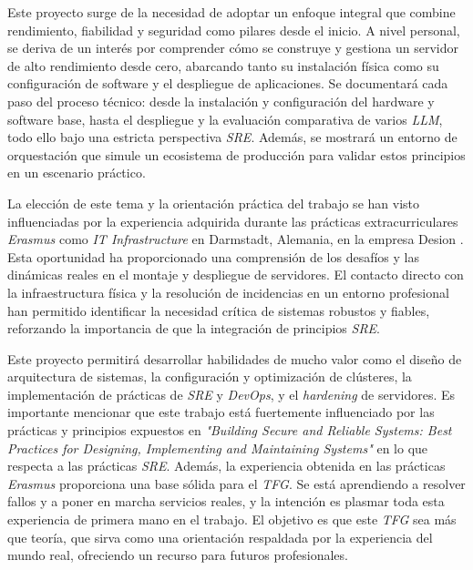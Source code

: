 Este proyecto surge de la necesidad de adoptar un enfoque integral que combine rendimiento, fiabilidad y seguridad como pilares desde el inicio. A nivel personal, se deriva de un interés por comprender cómo se construye y gestiona un servidor de alto rendimiento desde cero, abarcando tanto su instalación física como su configuración de software y el despliegue de aplicaciones. Se documentará cada paso del proceso técnico: desde la instalación y configuración del hardware y software base, hasta el despliegue y la evaluación comparativa de varios \textit{LLM}, todo ello bajo una estricta perspectiva \textit{SRE}. Además, se mostrará un entorno de orquestación que simule un ecosistema de producción para validar estos principios en un escenario práctico.

La elección de este tema y la orientación práctica del trabajo se han visto influenciadas por la experiencia adquirida durante las prácticas extracurriculares \textit{Erasmus} como \textit{IT Infrastructure} en Darmstadt, Alemania, en la empresa Desion \cite{ref38}. Esta oportunidad ha proporcionado una comprensión de los desafíos y las dinámicas reales en el montaje y despliegue de servidores. El contacto directo con la infraestructura física y la resolución de incidencias en un entorno profesional han permitido identificar la necesidad crítica de sistemas robustos y fiables, reforzando la importancia de que la integración de principios \textit{SRE}. %

Este proyecto permitirá desarrollar habilidades de mucho valor como el diseño de arquitectura de sistemas, la configuración y optimización de clústeres, la implementación de prácticas de \textit{SRE} y \textit{DevOps}, y el \textit{hardening} de servidores. Es importante mencionar que este trabajo está fuertemente influenciado por las prácticas y principios expuestos en \textit{"Building Secure and Reliable Systems: Best Practices for Designing, Implementing and Maintaining Systems"} \cite{ref6} en lo que respecta a las prácticas \textit{SRE}. Además, la experiencia obtenida en las prácticas \textit{Erasmus} proporciona una base sólida para el \textit{TFG}. Se está aprendiendo a resolver fallos y a poner en marcha servicios reales, y la intención es plasmar toda esta experiencia de primera mano en el trabajo. El objetivo es que este \textit{TFG} sea más que teoría, que sirva como una orientación respaldada por la experiencia del mundo real, ofreciendo un recurso para futuros profesionales.

